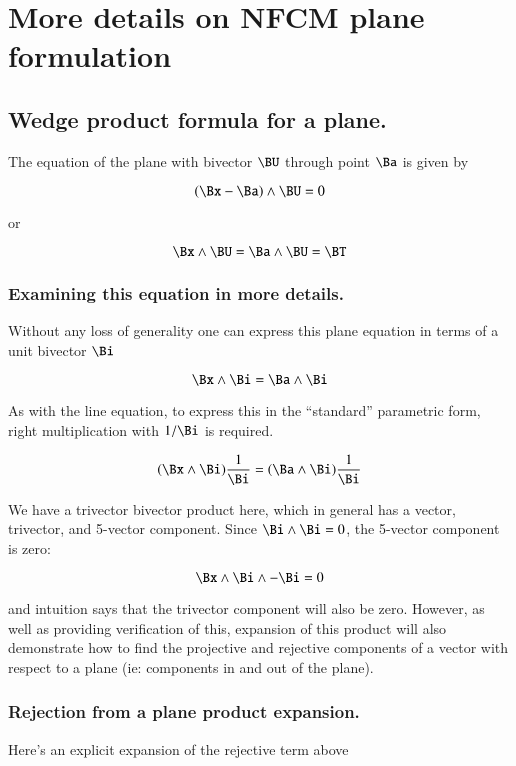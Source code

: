 \chapter{More details on NFCM plane formulation} 
\label{chap:plane}
\date{Jan 1, 2008.  plane.tex}

\section{Wedge product formula for a plane.}

The equation of the plane with bivector $\BU$ through point $\Ba$ is given
by

\[
(\Bx - \Ba) \wedge \BU = 0
\]

or

\[
\Bx \wedge \BU = \Ba \wedge \BU = \BT
\]

\subsection{Examining this equation in more details. }

Without any loss of generality one can express this plane equation
in terms of a unit bivector $\Bi$

\[
\Bx \wedge \Bi = \Ba \wedge \Bi
\]

As with the line equation, to express this in the ``standard'' parametric
form, right multiplication with $1/\Bi$ is required.

\[
(\Bx \wedge \Bi)\frac{1}{\Bi} = (\Ba \wedge \Bi)\frac{1}{\Bi}
\]

We have a trivector bivector product here, which in general has a vector,
trivector, and 5-vector component.  Since $\Bi \wedge \Bi = 0$, the
5-vector component is zero:

\[
\Bx \wedge \Bi \wedge -\Bi = 0
\]

and intuition says that the trivector component will also be zero.  However,
as well as providing verification of this, expansion of this product will also
demonstrate how to find the projective and rejective components of a vector
with respect to a plane (ie: components in and out of the plane).

\subsection{Rejection from a plane product expansion.}

Here's an explicit expansion of the rejective term above

